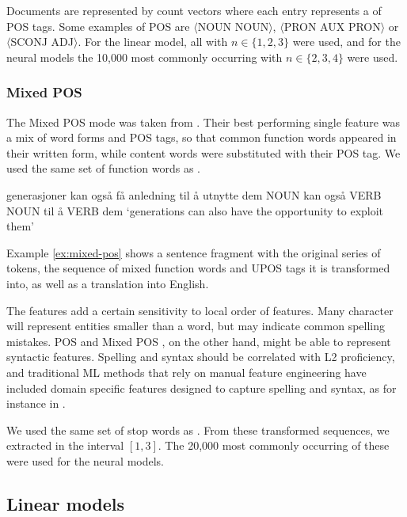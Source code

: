 Documents are represented by count vectors where each entry represents a
\ngram of POS tags. Some examples of POS \ngrams are $\langle$NOUN
NOUN$\rangle$, $\langle$PRON AUX PRON$\rangle$ or $\langle$SCONJ
ADJ$\rangle$. For the linear model, all \ngrams with $n\in \{1,2,3\}$ were
used, and for the neural models the 10,000 most commonly occurring \ngrams
with $n\in \{2,3,4\}$ were used.

\subsubsection*{Mixed POS}

The Mixed POS mode was taken from \textcite{malmasi15}. Their best performing
single feature was a mix of word forms and POS tags, so that common function
words appeared in their written form, while content words were substituted
with their POS tag. We used the same set of function words as
\citeauthor{malmasi15}.

\begin{example}
\gll generasjoner kan også få   anledning til å utnytte dem  
     NOUN         kan også VERB NOUN      til å VERB    dem  
\glt `generations can also have the opportunity to exploit them'
\glend
\label{ex:mixed-pos}
\end{example}

Example \ref{ex:mixed-pos} shows a sentence fragment with the original series
of tokens, the sequence of mixed function words and UPOS tags it is
transformed into, as well as a translation into English.

The \ngram features add a certain sensitivity to local order of features.
Many character \ngrams will represent entities smaller than a word, but may
indicate common spelling mistakes. \ac{POS} and Mixed POS \ngrams, on the
other hand, might be able to represent syntactic features. Spelling and
syntax should be correlated with L2 proficiency, and traditional \ac{ML}
methods that rely on manual feature engineering have included domain specific
features designed to capture spelling and syntax, as for instance in
\textcite{vajjala17}.

We used the same set of stop words as \citeauthor{malmasi15}. From these
transformed sequences, we extracted \ngrams in the interval $[1,3]$. The
20,000 most commonly occurring of these were used for the neural models.


\subsection{Linear models} \label{subsec:linear}

